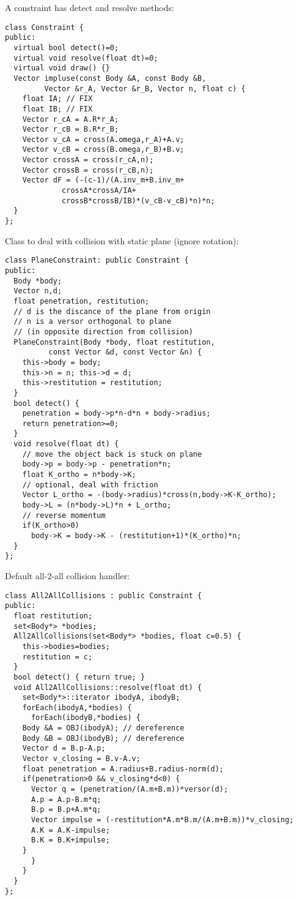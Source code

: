 \noindent
A constraint has detect and resolve methods: \begin{lstlisting}
class Constraint {
public:  
  virtual bool detect()=0;
  virtual void resolve(float dt)=0;
  virtual void draw() {}
  Vector impluse(const Body &A, const Body &B, 
		 Vector &r_A, Vector &r_B, Vector n, float c) {
    float IA; // FIX
    float IB; // FIX
    Vector r_cA = A.R*r_A;
    Vector r_cB = B.R*r_B;
    Vector v_cA = cross(A.omega,r_A)+A.v;
    Vector v_cB = cross(B.omega,r_B)+B.v;
    Vector crossA = cross(r_cA,n);
    Vector crossB = cross(r_cB,n);
    Vector dF = (-(c-1)/(A.inv_m+B.inv_m+
			 crossA*crossA/IA+
			 crossB*crossB/IB)*(v_cB-v_cB)*n)*n;
  }
};
\end{lstlisting}
\noindent
Class to deal with collision with static plane
(ignore rotation): \begin{lstlisting}
class PlaneConstraint: public Constraint {
public:
  Body *body;
  Vector n,d;
  float penetration, restitution;
  // d is the discance of the plane from origin
  // n is a versor orthogonal to plane 
  // (in opposite direction from collision)
  PlaneConstraint(Body *body, float restitution,
		  const Vector &d, const Vector &n) {
    this->body = body;
    this->n = n; this->d = d;
    this->restitution = restitution;
  }
  bool detect() {
    penetration = body->p*n-d*n + body->radius;
    return penetration>=0;
  }
  void resolve(float dt) {
    // move the object back is stuck on plane 
    body->p = body->p - penetration*n;
    float K_ortho = n*body->K;
    // optional, deal with friction 
    Vector L_ortho = -(body->radius)*cross(n,body->K-K_ortho);
    body->L = (n*body->L)*n + L_ortho;
    // reverse momentum
    if(K_ortho>0)
      body->K = body->K - (restitution+1)*(K_ortho)*n;
  }
};
\end{lstlisting}
\noindent
Default all-2-all collision handler: \begin{lstlisting}
class All2AllCollisions : public Constraint {
public:  
  float restitution;
  set<Body*> *bodies;
  All2AllCollisions(set<Body*> *bodies, float c=0.5) {
    this->bodies=bodies;
    restitution = c;
  }
  bool detect() { return true; }
  void All2AllCollisions::resolve(float dt) {
    set<Body*>::iterator ibodyA, ibodyB;
    forEach(ibodyA,*bodies) {
      forEach(ibodyB,*bodies) {
	Body &A = OBJ(ibodyA); // dereference
	Body &B = OBJ(ibodyB); // dereference
	Vector d = B.p-A.p;
	Vector v_closing = B.v-A.v;
	float penetration = A.radius+B.radius-norm(d);	  
	if(penetration>0 && v_closing*d<0) {
	  Vector q = (penetration/(A.m+B.m))*versor(d);
	  A.p = A.p-B.m*q;
	  B.p = B.p+A.m*q;
	  Vector impulse = (-restitution*A.m*B.m/(A.m+B.m))*v_closing;
	  A.K = A.K-impulse;
	  B.K = B.K+impulse;
	}
      } 
    }
  }
};
\end{lstlisting}

